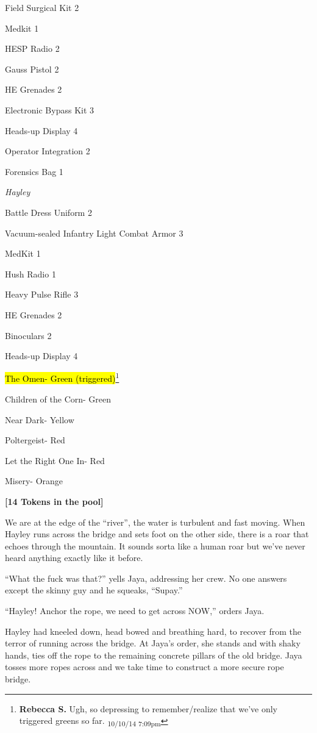 Field Surgical Kit 2

Medkit 1

HESP Radio 2

Gauss Pistol 2

HE Grenades 2

Electronic Bypass Kit 3

Heads-up Display 4

Operator Integration 2

Forensics Bag 1



\textit{Hayley}

Battle Dress Uniform 2

Vacuum-sealed Infantry Light Combat Armor 3

MedKit 1

Hush Radio 1

Heavy Pulse Rifle 3

HE Grenades 2

Binoculars 2

Heads-up Display 4



\hl{The Omen- Green (triggered)}\footnote{\textbf{Rebecca S. }Ugh, so depressing to remember/realize that we've only triggered greens so far. \textsubscript{10/10/14 7:09pm}}

Children of the Corn- Green

Near Dark- Yellow

Poltergeist- Red

Let the Right One In- Red

Misery- Orange



\textbf{{[}14 Tokens in the pool{]}}



We are at the edge of the ``river'', the water is turbulent and fast moving.  When Hayley runs across the bridge and sets foot on the other side, there is a roar that echoes through the mountain.  It sounds sorta like a human roar but we've never heard anything exactly like it before. 

``What the fuck was that?'' yells Jaya, addressing her crew.  No one answers except the skinny guy and he squeaks, ``Supay.''

``Hayley!  Anchor the rope, we need to get across NOW,'' orders Jaya.

Hayley had kneeled down, head bowed and breathing hard, to recover from the terror of running across the bridge.  At Jaya's order, she stands and with shaky hands, ties off the rope to the remaining concrete pillars of the old bridge.  Jaya tosses more ropes across and we take time to construct a more secure rope bridge. 



